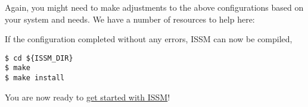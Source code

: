 Again, you might need to make adjustments to the above configurations based on your system and needs. We have a number of resources to help here:

If the configuration completed without any errors, ISSM can now be compiled,
\begin{lstlisting}
$ cd ${ISSM_DIR}
$ make
$ make install
\end{lstlisting}

You are now ready to 
\hyperref[chap:getting-started]{get started with ISSM}!

